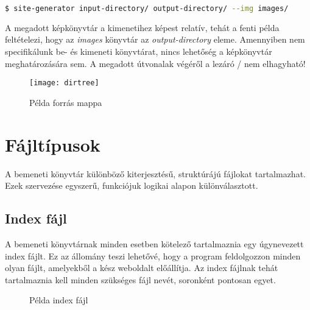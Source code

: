 \documentclass[a4paper,10pt]{article}
\begin{document}
\begin{lstlisting}[language=bash]
$ site-generator input-directory/ output-directory/ --img images/
\end{lstlisting}

A megadott képkönyvtár a kimenetihez képest relatív, tehát a fenti példa feltételezi, hogy az \emph{images} könyvtár az \emph{output-directory} eleme.
Amennyiben nem specifikálunk be- és kimeneti könyvtárat, nincs lehetőség a képkönyvtár meghatározására sem. A megadott útvonalak végéről a lezáró / nem elhagyható!

\begin{figure}[h]
	\begin{center}
		\texttt{[image: dirtree]}
		\caption{Példa forrás mappa}
	\end{center}
\end{figure}


\section{Fájltípusok}
A bemeneti könyvtár különböző kiterjesztésű, struktúrájú fájlokat tartalmazhat. Ezek szervezése egyszerű, funkciójuk logikai alapon különválasztott.

\subsection{Index fájl}
A bemeneti könyvtárnak minden esetben kötelező tartalmaznia egy úgynevezett index fájlt. Ez az állomány teszi lehetővé, hogy a program feldolgozzon minden olyan fájlt, amelyekből a kész weboldalt előállítja.
Az index fájlnak tehát tartalmaznia kell minden szükséges fájl nevét, soronként pontosan egyet.

\begin{wrapfigure}{r}{0.3\textwidth}
		\centering
		\caption{Példa index fájl}
\end{wrapfigure}
\end{document}
